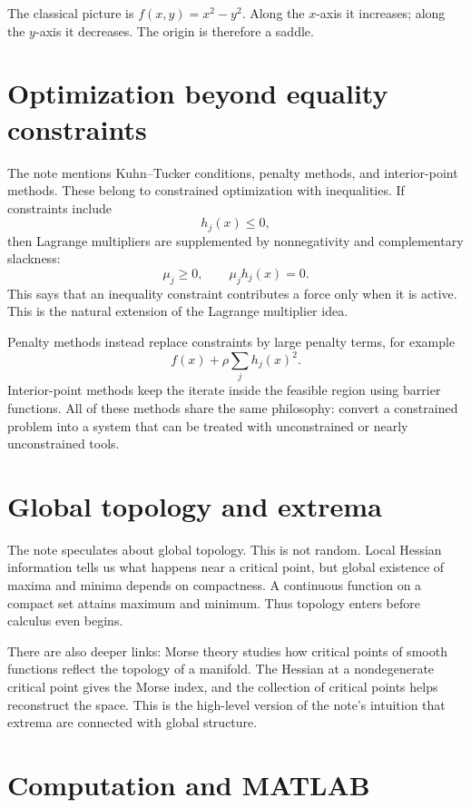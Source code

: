 The classical picture is $f(x,y)=x^2-y^2$.  Along the $x$-axis it increases; along the $y$-axis it decreases.  The origin is therefore a saddle.

\section{Optimization beyond equality constraints}

The note mentions Kuhn--Tucker conditions, penalty methods, and interior-point methods.  These belong to constrained optimization with inequalities.  If constraints include
\[
  h_j(x)\le0,
\]
then Lagrange multipliers are supplemented by nonnegativity and complementary slackness:
\[
  \mu_j\ge0,
  \qquad
  \mu_jh_j(x)=0.
\]
This says that an inequality constraint contributes a force only when it is active.  This is the natural extension of the Lagrange multiplier idea.

Penalty methods instead replace constraints by large penalty terms, for example
\[
  f(x)+\rho \sum_j h_j(x)^2.
\]
Interior-point methods keep the iterate inside the feasible region using barrier functions.  All of these methods share the same philosophy: convert a constrained problem into a system that can be treated with unconstrained or nearly unconstrained tools.

\section{Global topology and extrema}

The note speculates about global topology.  This is not random.  Local Hessian information tells us what happens near a critical point, but global existence of maxima and minima depends on compactness.  A continuous function on a compact set attains maximum and minimum.  Thus topology enters before calculus even begins.

There are also deeper links: Morse theory studies how critical points of smooth functions reflect the topology of a manifold.  The Hessian at a nondegenerate critical point gives the Morse index, and the collection of critical points helps reconstruct the space.  This is the high-level version of the note's intuition that extrema are connected with global structure.

\section{Computation and MATLAB}

